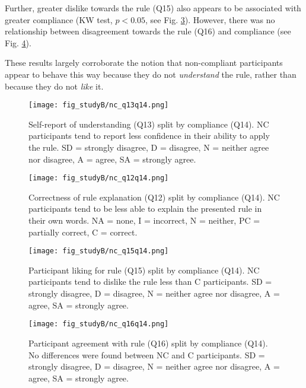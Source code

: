 \documentclass{article}
\begin{document}
Further, greater dislike towards the rule (Q15) also appears to be associated with greater compliance (KW test, $p<0.05$, see Fig. \ref{fig:studyB_nc_q15q14}). However, there was no relationship between disagreement towards the rule (Q16) and compliance (see Fig. \ref{fig:studyB_nc_q16q14}).

These results largely corroborate the notion that non-compliant participants appear to behave this way because they do not \emph{understand} the rule, rather than because they do not \emph{like} it. 

\begin{figure}[h]
    \centering
    \texttt{[image: fig\_studyB/nc\_q13q14.png]}
    \vspace{-15pt}
    \caption{Self-report of understanding (Q13) split by compliance (Q14). NC participants tend to report less confidence in their ability to apply the rule. SD = strongly disagree, D = disagree, N = neither agree nor disagree, A = agree, SA = strongly agree.}
    \label{fig:studyB_nc_q13q14}
    \vspace{-5pt}
\end{figure}

\begin{figure}[h]
    \centering
    \texttt{[image: fig\_studyB/nc\_q12q14.png]}
    \vspace{-15pt}
    \caption{Correctness of rule explanation (Q12) split by compliance (Q14). NC participants tend to be less able to explain the presented rule in their own words. NA = none, I = incorrect, N = neither, PC = partially correct, C = correct.}
    \label{fig:studyB_nc_q12q14}
    \vspace{-5pt}
\end{figure}

\begin{figure}[h]
    \centering
    \texttt{[image: fig\_studyB/nc\_q15q14.png]}
    \vspace{-15pt}
    \caption{Participant liking for rule (Q15) split by compliance (Q14). NC participants tend to dislike the rule less than C participants. SD = strongly disagree, D = disagree, N = neither agree nor disagree, A = agree, SA = strongly agree.}
    \label{fig:studyB_nc_q15q14}
    \vspace{-5pt}
\end{figure}

\begin{figure}[h]
    \centering
    \texttt{[image: fig\_studyB/nc\_q16q14.png]}
    \vspace{-15pt}
    \caption{Participant agreement with rule (Q16) split by compliance (Q14). No differences were found between NC and C participants. SD = strongly disagree, D = disagree, N = neither agree nor disagree, A = agree, SA = strongly agree.}
    \label{fig:studyB_nc_q16q14}
    \vspace{-5pt}
\end{figure} 
\end{document}
